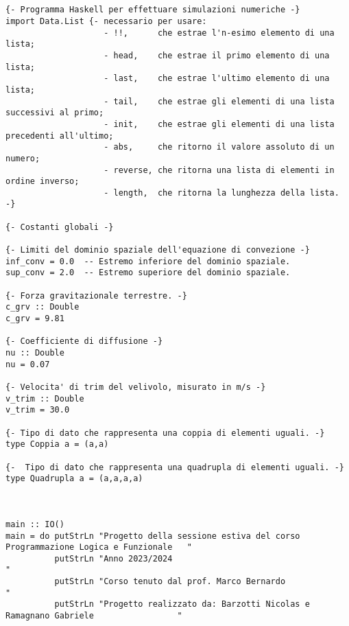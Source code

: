 
\begin{verbatim}
   

{- Programma Haskell per effettuare simulazioni numeriche -}
import Data.List {- necessario per usare: 
                    - !!,      che estrae l'n-esimo elemento di una lista;
                    - head,    che estrae il primo elemento di una lista;
                    - last,    che estrae l'ultimo elemento di una lista; 
                    - tail,    che estrae gli elementi di una lista successivi al primo;
                    - init,    che estrae gli elementi di una lista precedenti all'ultimo;
                    - abs,     che ritorno il valore assoluto di un numero;
                    - reverse, che ritorna una lista di elementi in ordine inverso;
                    - length,  che ritorna la lunghezza della lista. -}

{- Costanti globali -}

{- Limiti del dominio spaziale dell'equazione di convezione -}
inf_conv = 0.0  -- Estremo inferiore del dominio spaziale.
sup_conv = 2.0  -- Estremo superiore del dominio spaziale.

{- Forza gravitazionale terrestre. -}
c_grv :: Double
c_grv = 9.81 

{- Coefficiente di diffusione -}
nu :: Double
nu = 0.07  

{- Velocita' di trim del velivolo, misurato in m/s -}
v_trim :: Double
v_trim = 30.0     

{- Tipo di dato che rappresenta una coppia di elementi uguali. -}
type Coppia a = (a,a)

{-  Tipo di dato che rappresenta una quadrupla di elementi uguali. -}
type Quadrupla a = (a,a,a,a)



main :: IO()
main = do putStrLn "Progetto della sessione estiva del corso Programmazione Logica e Funzionale   "
          putStrLn "Anno 2023/2024                                                                "
          putStrLn "Corso tenuto dal prof. Marco Bernardo                                         "
          putStrLn "Progetto realizzato da: Barzotti Nicolas e Ramagnano Gabriele                 "
          

\end{verbatim}
